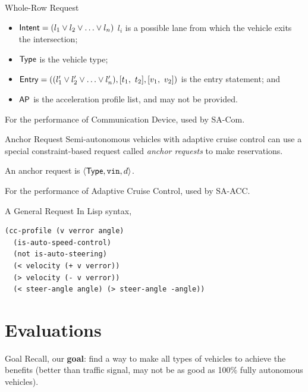 \documentclass{beamer}
\newcommand{\goal}{find a way to make all types of vehicles to
achieve the benefits (better than traffic signal, may not be as good
as 100\% fully autonomous vehicles)}
\begin{document}
\begin{frame}{Whole-Row Request}
\begin{itemize}
\item ${\sf Intent} = ( l_1 \vee l_2 \vee \ldots \vee l_n )$ $l_i$ is a possible lane from which the vehicle exits the intersection;
\item ${\sf Type}$ is the vehicle type;
\item ${\sf Entry} = (( l'_1 \vee l'_2 \vee \ldots \vee l'_n ), [t_1,\ t_2], [v_1,\ v_2])$ is the entry statement; and
\item ${\sf AP}$ is the acceleration profile list, and may not be
provided.
\end{itemize}

For the performance of Communication Device, used by SA-Com.
\end{frame}

\begin{frame}{Anchor Request}
Semi-autonomous vehicles with adaptive cruise control can use a special
constraint-based request called \emph{anchor requests} to make
reservations.

\hfill

An anchor request is $\langle {\sf Type}, \texttt{vin},
d \rangle$.

For the performance of Adaptive Cruise Control, used by SA-ACC.
\end{frame}

\begin{frame}[fragile]{A General Request}
In Lisp syntax,

\begin{small}
\begin{verbatim}
(cc-profile (v verror angle)
  (is-auto-speed-control)
  (not is-auto-steering)
  (< velocity (+ v verror))
  (> velocity (- v verror))
  (< steer-angle angle) (> steer-angle -angle))
\end{verbatim}
\end{small}
\end{frame}

\section{Evaluations}

\begin{frame}{Goal}
Recall, our \textbf{goal}: \pause \goal.
\end{frame}
\end{document}

